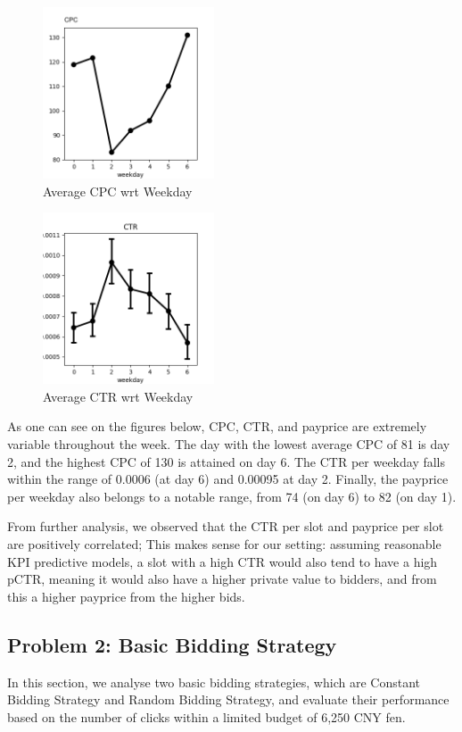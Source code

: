 \documentclass{sig-alternate-05-2015}
\begin{document}
\begin{figure}
\centering
\includegraphics[height=2in, width=2in]{images/weekday_CPC.png}
\caption{Average CPC wrt Weekday}
\end{figure}

\begin{figure}
\centering
\includegraphics[height=2in, width=2in]{images/weekday_CTR.png}
\caption{Average CTR wrt Weekday}
\end{figure}

As one can see on the figures below, CPC, CTR, and payprice are extremely variable throughout the week.
The day with the lowest average CPC of 81 is day 2, and the highest CPC of 130 is attained on day 6.
The CTR per weekday falls within the range of 0.0006 (at day 6) and 0.00095 at day 2.
Finally, the payprice per weekday also belongs to a notable range, from 74 (on day 6) to 82 (on day 1).

From further analysis, we observed that the CTR per slot and payprice per slot are positively correlated;
This makes sense for our setting: assuming reasonable KPI predictive models, a slot with a high CTR would also tend to have a high pCTR,
meaning it would also have a higher private value to bidders, and from this a higher payprice from the higher bids.





\subsection{Problem 2: Basic Bidding Strategy}
In this section, we analyse two basic bidding strategies, which are Constant Bidding Strategy and Random Bidding Strategy, and evaluate their performance based on the number of clicks within a limited budget of 6,250 CNY fen.
\end{document}
